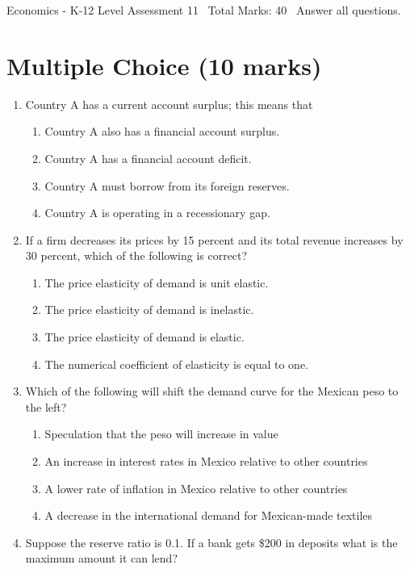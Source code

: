 \documentclass[12pt]{article}
\begin{document}
\begin{center}
Economics - K-12 Level Assessment 11 \
Total Marks: 40 \
Answer all questions.
\end{center}

\section*{Multiple Choice (10 marks)}
\begin{enumerate}[label=\arabic*.]
\item Country A has a current account surplus; this means that
\begin{enumerate}[label=(\alph*)]
    \item Country A also has a financial account surplus.
    \item Country A has a financial account deficit.
    \item Country A must borrow from its foreign reserves.
    \item Country A is operating in a recessionary gap.
\end{enumerate}
\item If a firm decreases its prices by 15 percent and its total revenue increases by 30 percent, which of the following is correct?
\begin{enumerate}[label=(\alph*)]
    \item The price elasticity of demand is unit elastic.
    \item The price elasticity of demand is inelastic.
    \item The price elasticity of demand is elastic.
    \item The numerical coefficient of elasticity is equal to one.
\end{enumerate}
\item Which of the following will shift the demand curve for the Mexican peso to the left?
\begin{enumerate}[label=(\alph*)]
    \item Speculation that the peso will increase in value
    \item An increase in interest rates in Mexico relative to other countries
    \item A lower rate of inflation in Mexico relative to other countries
    \item A decrease in the international demand for Mexican-made textiles
\end{enumerate}
\item Suppose the reserve ratio is 0.1. If a bank gets \$200 in deposits what is the maximum amount it can lend?

\end{enumerate}
\end{document}
